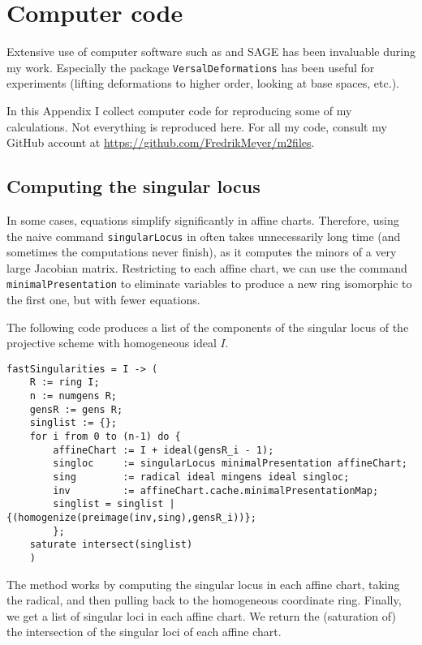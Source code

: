 \chapter{Computer code}
\label{sec:computercode}

Extensive use of computer software such as \MM \cite{M2} and SAGE \cite{sagemath} has been invaluable during my work. Especially the \MM package \texttt{VersalDeformations} \cite{ilten_versaldeformations} has been useful for experiments (lifting deformations to higher order, looking at base spaces, etc.).

In this Appendix I collect computer code for reproducing some of my calculations. Not everything is reproduced here. For all my code, consult my GitHub account at \url{https://github.com/FredrikMeyer/m2files}.

\section{Computing the singular locus}

In some cases, equations simplify significantly in affine charts. Therefore, using the naive command \texttt{singularLocus} in \MM often takes unnecessarily long time (and sometimes the computations never finish), as it computes the minors of a very large Jacobian matrix. Restricting to each affine chart, we can use the command \texttt{minimalPresentation} to eliminate variables to produce a new ring isomorphic to the first one, but with fewer equations.

The following code produces a list of the components of the singular locus of the projective scheme with homogeneous ideal $I$.

\begin{lstlisting}[language=Macaulay2]
fastSingularities = I -> (
    R := ring I;
    n := numgens R;
    gensR := gens R;
    singlist := {};
    for i from 0 to (n-1) do {
        affineChart := I + ideal(gensR_i - 1);
        singloc     := singularLocus minimalPresentation affineChart;
        sing        := radical ideal mingens ideal singloc;
        inv         := affineChart.cache.minimalPresentationMap;
        singlist = singlist | {(homogenize(preimage(inv,sing),gensR_i))};
        };
    saturate intersect(singlist)
    )
\end{lstlisting}

The method works by computing the singular locus in each affine chart, taking the radical, and then pulling back to the homogeneous coordinate ring. Finally, we get a list of singular loci in each affine chart. We return the (saturation of) the intersection of the singular loci of each affine chart.

